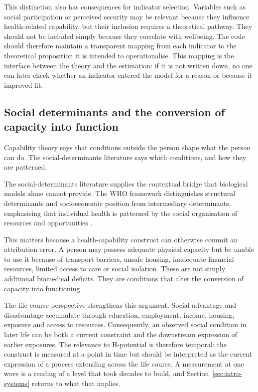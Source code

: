 This distinction also has consequences for indicator selection. Variables such as social participation or perceived security may be relevant because they influence health-related capability, but their inclusion requires a theoretical pathway. They should not be included simply because they correlate with wellbeing. The code should therefore maintain a transparent mapping from each indicator to the theoretical proposition it is intended to operationalise. This mapping is the interface between the theory and the estimation: if it is not written down, no one can later check whether an indicator entered the model for a reason or because it improved fit.

\subsection{Social determinants and the conversion of capacity into function}

Capability theory says that conditions outside the person shape what the person can do. The social-determinants literature says which conditions, and how they are patterned.

The social-determinants literature supplies the contextual bridge that biological models alone cannot provide. The WHO framework distinguishes structural determinants and socioeconomic position from intermediary determinants, emphasising that individual health is patterned by the social organisation of resources and opportunities \citep{solar_irwin_2010}.

This matters because a health-capability construct can otherwise commit an attribution error. A person may possess adequate physical capacity but be unable to use it because of transport barriers, unsafe housing, inadequate financial resources, limited access to care or social isolation. These are not simply additional biomedical deficits. They are conditions that alter the conversion of capacity into functioning.

The life-course perspective strengthens this argument. Social advantage and disadvantage accumulate through education, employment, income, housing, exposure and access to resources. Consequently, an observed social condition in later life can be both a current constraint and the downstream expression of earlier exposures. The relevance to H-potential is therefore temporal: the construct is measured at a point in time but should be interpreted as the current expression of a process extending across the life course. A measurement at one wave is a reading of a level that took decades to build, and Section~\ref{sec:intro-systems} returns to what that implies.

